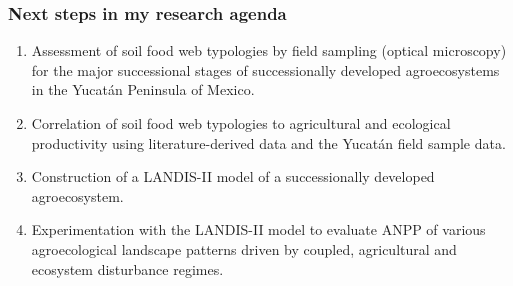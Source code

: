 \documentclass[
paper=128mm:96mm, %
fontsize=11pt, %
pagesize, %
parskip=half-, %
]{scrartcl}
\theoremstyle{mythmstyle} %
\begin{document}
\clearpage

\subsubsection{Next steps in my research agenda}    
\begin{enumerate}
	\item Assessment of soil food web typologies by field sampling (optical microscopy) for the major successional stages of successionally developed agroecosystems in the Yucat\'an Peninsula of Mexico.
	\item Correlation of soil food web typologies to agricultural and ecological productivity using literature-derived data and the Yucat\'an field sample data.
	\item Construction of a LANDIS-II model of a successionally developed agroecosystem.
	\item Experimentation with the LANDIS-II model to evaluate ANPP of various agroecological landscape patterns driven by coupled, agricultural and ecosystem disturbance regimes.
\end{enumerate}
\end{document}
